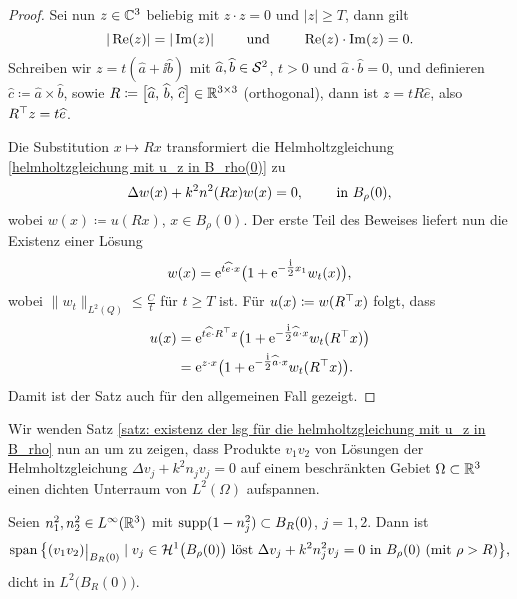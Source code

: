 \begin{proof}
	Sei nun \(z\in\mathbb{C}^3\) beliebig mit \(z\cdot z=0\) und \(|z|\geq T\), dann gilt
	\begin{equation*}
		|\operatorname{Re}(z)|=|\operatorname{Im}(z)|\qquad\text{ und }\qquad\operatorname{Re}(z)\cdot\operatorname{Im}(z)=0.
	\end{equation*}
	Schreiben wir \(z=t(\widehat{a}+\ii\widehat{b})\) mit \(\widehat{a},\widehat{b}\in\mathcal{S}^2\), \(t>0\) und \(\widehat{a}\cdot\widehat{b}=0\), und definieren \(\widehat{c}\coloneqq\widehat{a}\times\widehat{b}\), sowie \(R\coloneqq\big[\widehat{a},\,\widehat{b},\,\widehat{c}\big]\in\mathbb{R}^{3\times 3}\) (orthogonal), dann ist \(z=tR\widehat{e}\), also \(R^\top z=t\widehat{e}\).
	
	Die Substitution \(x\mapsto Rx\) transformiert die Helmholtzgleichung \eqref{helmholtzgleichung mit u_z in B_rho(0)} zu
	\begin{equation*}
		\Delta w(x)+k^2n^2(Rx)w(x)=0,\qquad\text{ in }B_\rho(0),
	\end{equation*}
	wobei \(w(x)\coloneqq u(Rx)\), \(x\in B_\rho(0)\). Der erste Teil des Beweises liefert nun die Existenz einer Lösung
	\begin{equation*}
		w(x)=\mathrm{e}^{t\widehat{e}\cdot x}\big(1+\mathrm{e}^{-\tfrac{\mathrm{i}}{2}x_1}w_t(x)\big),
	\end{equation*}
	wobei \(\|w_t\|_{L^2(Q)}\leq\frac{C}{t}\) für \(t\geq T\) ist. Für \(u(x)\coloneqq w(R^\top x)\) folgt, dass
	\begin{align*}
		u(x)&=\mathrm{e}^{t\widehat{e}\cdot R^\top x}\big(1+\mathrm{e}^{-\tfrac{\mathrm{i}}{2}\widehat{a}\cdot x}w_t(R^\top x)\big)\\
		&=\mathrm{e}^{z\cdot x}\big(1+\mathrm{e}^{-\tfrac{\mathrm{i}}{2}\widehat{a}\cdot x}w_t(R^\top x)\big).
	\end{align*}
	Damit ist der Satz auch für den allgemeinen Fall gezeigt.
\end{proof}
Wir wenden Satz \ref{satz: existenz der lsg für die helmholtzgleichung mit u_z in B_rho} nun an um zu zeigen, dass Produkte \(v_1v_2\) von Lösungen der Helmholtzgleichung \(\Delta v_j+k^2n_jv_j=0\) auf einem beschränkten Gebiet \(\Omega\subset\mathbb{R}^3\) einen dichten Unterraum von \(L^2(\Omega)\) aufspannen.
\begin{satz}\label{satz: span von produkten von lösungen ist dicht in L2 BR0}
	Seien \(n_1^2,n_2^2\in L^\infty(\mathbb{R}^3)\) mit \(\operatorname{supp}(1-n_j^2)\subset B_R(0)\), \(j=1,2\). Dann ist
	\begin{equation*}
		\spann\big\{(v_1v_2)\restrict{B_R(0)}\mid v_j\in\H^1\big(B_\rho(0)\big)\te{ löst }\Delta v_j+k^2n_j^2v_j=0\te{ in }B_\rho(0) \te{ (mit }\rho>R\te{)}\big\},
	\end{equation*}
	dicht in \(L^2\big(B_R(0)\big)\).
\end{satz}
